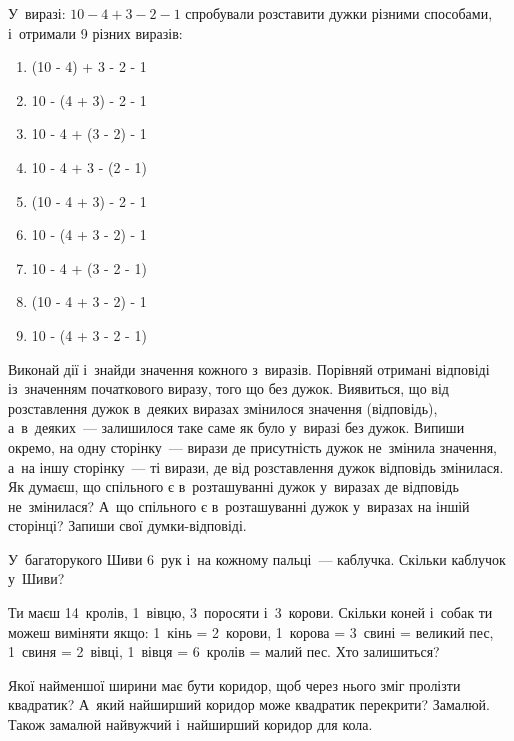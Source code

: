 \problem
{}
У~виразі: $10 - 4 + 3 - 2 - 1$ спробували розставити дужки різними способами,
і~отримали 9 різних виразів:
\begin{multicols}{2}
    \begin{enumerate}
        \item (10 - 4) + 3 - 2 - 1
        \item 10 - (4 + 3) - 2 - 1
        \item 10 - 4 + (3 - 2) - 1
        \item 10 - 4 + 3 - (2 - 1)
        \item (10 - 4 + 3) - 2 - 1
        \item 10 - (4 + 3 - 2) - 1
        \item 10 - 4 + (3 - 2 - 1)
        \item (10 - 4 + 3 - 2) - 1
        \item 10 - (4 + 3 - 2 - 1)
    \end{enumerate}
\end{multicols}
Виконай дії і~знайди значення кожного з~виразів.
Порівняй отримані відповіді із~значенням початкового виразу,
того що без дужок.
Виявиться, що від розставлення дужок в~деяких виразах змінилося
значення (відповідь), а~в~деяких~--- залишилося таке саме
як було у~виразі без дужок.
Випиши окремо, на одну сторінку~--- вирази де присутність дужок
не~змінила значення, а~на іншу сторінку~--- ті вирази,
де від розставлення дужок відповідь змінилася.
Як думаєш, що спільного є в~розташуванні дужок у~виразах
де відповідь не~змінилася?
А~що спільного є в~розташуванні дужок у~виразах на іншій сторінці?
Запиши свої думки-відповіді.


\problem
У~багаторукого Шиви 6~рук і~на кожному пальці~--- каблучка.
Скільки каблучок у~Шиви?


\problem
{}
Ти маєш 14~кролів, 1~вівцю, 3~поросяти і~3~корови.
Скільки коней і~собак ти можеш виміняти якщо:
1~кінь = 2~корови,
1~корова = 3~свині = великий пес,
1~свиня = 2~вівці,
1~вівця = 6~кролів = малий пес.
Хто залишиться?


\problem
{}
Якої найменшої ширини має бути коридор,
щоб через нього зміг пролізти квадратик?
А~який найширший коридор може квадратик перекрити?
Замалюй. Також замалюй найвужчий і~найширший коридор для кола.


